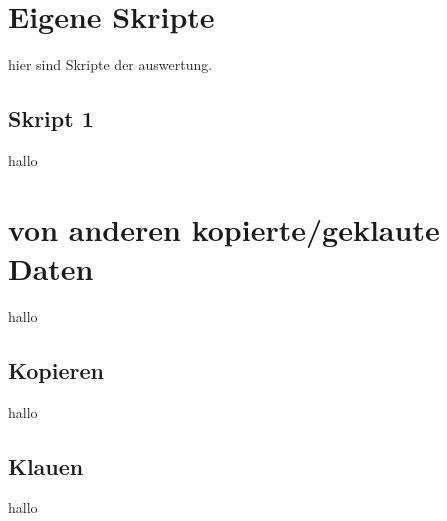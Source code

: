 
\chapter{Eigene Skripte}
\label{cha:eigene_skripte}

hier sind Skripte der auswertung.

\section{Skript 1}
\label{sec:skript1}

hallo\\


\chapter{von anderen kopierte/geklaute Daten}
\label{cha:kopierenundklauen}

hallo
\section{Kopieren}
\label{sec:kopie}

hallo\\

\section{Klauen}
\label{sec:klauen}

hallo\\


